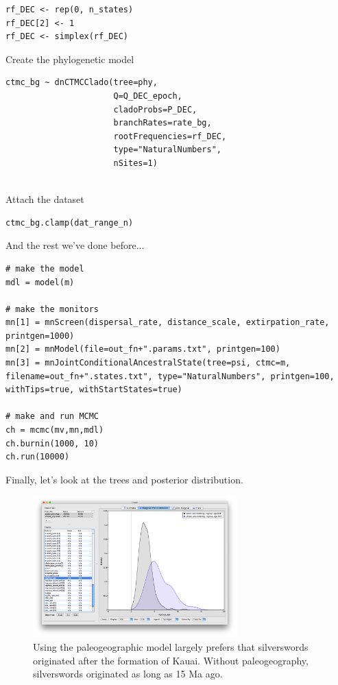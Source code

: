 \begin{snugshade}
\begin{lstlisting}
rf_DEC <- rep(0, n_states)
rf_DEC[2] <- 1
rf_DEC <- simplex(rf_DEC)
\end{lstlisting}
\end{snugshade}


Create the phylogenetic model
\begin{snugshade}
\begin{lstlisting}
ctmc_bg ~ dnCTMCClado(tree=phy,
                      Q=Q_DEC_epoch,
                      cladoProbs=P_DEC,
                      branchRates=rate_bg,
                      rootFrequencies=rf_DEC,
                      type="NaturalNumbers",
                      nSites=1)
                  
\end{lstlisting}
\end{snugshade}


Attach the dataset
\begin{snugshade}
\begin{lstlisting}
ctmc_bg.clamp(dat_range_n)
\end{lstlisting}
\end{snugshade}


And the rest we've done before...
\begin{snugshade}
\begin{lstlisting}
# make the model
mdl = model(m)

# make the monitors
mn[1] = mnScreen(dispersal_rate, distance_scale, extirpation_rate, printgen=1000)
mn[2] = mnModel(file=out_fn+".params.txt", printgen=100)
mn[3] = mnJointConditionalAncestralState(tree=psi, ctmc=m, filename=out_fn+".states.txt", type="NaturalNumbers", printgen=100, withTips=true, withStartStates=true)

# make and run MCMC
ch = mcmc(mv,mn,mdl)
ch.burnin(1000, 10)
ch.run(10000)
\end{lstlisting}
\end{snugshade}


Finally, let's look at the trees and posterior distribution.

\begin{figure}[!ht]
\centering
\includegraphics[width=0.7\textwidth]{figures/fig_biogeo_dating_ingroup_age.png}
\caption{Using the paleogeographic model largely prefers that silverswords originated after the formation of Kauai. Without paleogeography, silverswords originated as long as 15 Ma ago.}
\end{figure}


